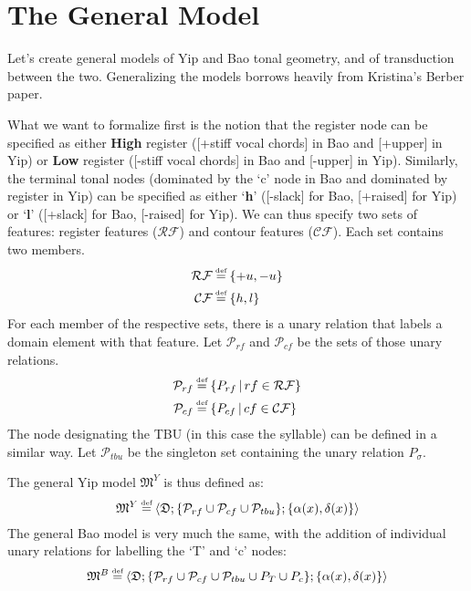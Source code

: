 \documentclass{article}
\newcommand\myeq{\mathrel{\stackrel{\makebox[0pt]{\mbox{\normalfont\tiny def}}}{=}}}
\begin{document}
\section{The General Model}
Let's create general models of Yip and Bao tonal geometry, and of transduction between the two. Generalizing the models borrows heavily from Kristina's Berber paper. \par
What we want to formalize first is the notion that the register node can be specified as either \textbf{High} register ([+stiff vocal chords] in Bao and [+upper] in Yip) or \textbf{Low} register ([-stiff vocal chords] in Bao and [-upper] in Yip). Similarly, the terminal tonal nodes (dominated by the `c' node in Bao and dominated by register in Yip) can be specified as either `\textbf{h}' ([-slack] for Bao, [+raised] for Yip) or `\textbf{l}' ([+slack] for Bao, [-raised] for Yip). We can thus specify two sets of features: register features ($\mathcal{RF}$) and contour features ($\mathcal{CF}$). Each set contains two members.
\begin{align}
\mathcal{RF} &\myeq \{+u, -u\} \\
\mathcal{CF} &\myeq \{h, l\}
\end{align}
For each member of the respective sets, there is a unary relation that labels a domain element with that feature. Let $\mathcal{P}_{rf}$ and $\mathcal{P}_{cf}$ be the sets of those unary relations.
 \begin{align}
 \mathcal{P}_{rf} &\myeq \{P_{rf}\,|\,rf \in \mathcal{RF}\} \\
 \mathcal{P}_{cf} &\myeq \{P_{cf}\,|\,cf \in \mathcal{CF}\}
 \end{align}
The node designating the TBU (in this case the syllable) can be defined in a similar way. Let $\mathcal{P}_{tbu}$ be the singleton set containing the unary relation $P_{\sigma}$. \par
The general Yip model $\mathfrak{M}^Y$ is thus defined as:
\begin{equation}
\mathfrak{M}^{Y} \myeq \langle\mathfrak{D}; \{\mathcal{P}_{rf}\cup\mathcal{P}_{cf}\cup\mathcal{P}_{tbu}\};\{\alpha(x), \delta(x)\}\rangle
\end{equation}
The general Bao model is very much the same, with the addition of individual unary relations for labelling the `T' and `c' nodes:
\begin{equation}
\mathfrak{M}^{B} \myeq \langle\mathfrak{D}; \{\mathcal{P}_{rf}\cup\mathcal{P}_{cf}\cup\mathcal{P}_{tbu}\cup P_{T}\cup P_{c}\};\{\alpha(x), \delta(x)\}\rangle
\end{equation} 
\end{document}
